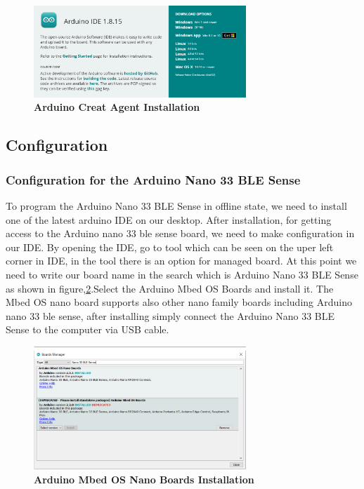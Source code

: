 \begin{figure}[H]\centering
	\includegraphics[width=8cm]{Images/software/ArduinoCreatAgentInstallation}
	\caption{\textbf{Arduino Creat Agent Installation}}
	\label{fig:ArduinoCreatAgentInstallation}		
\end{figure}

\subsection{Configuration}
\subsubsection{Configuration for the Arduino Nano 33 BLE Sense}
To program the Arduino Nano 33 BLE Sense in offline state, we need to install one
of the latest arduino IDE on our desktop. After installation, for getting access to
the Arduino nano 33 ble sense board, we need to make configuration in our IDE. By
opening the IDE, go to tool which can be seen on the uper left corner in IDE, in the
tool there is an option for managed board. At this point we need to write our board
name in the search which is Arduino Nano 33 BLE Sense as shown in figure,\ref{fig:ArduinoMbedOSNanoBoardsInstallation}.Select
the Arduino Mbed OS Boards and install it. The Mbed OS nano board supports also
other nano family boards including Arduino nano 33 ble sense, after installing simply
connect the Arduino Nano 33 BLE Sense to the computer via USB cable.


\begin{figure}[H]\centering
	\includegraphics[width=8cm]{Images/software/ArduinoMbedOSNanoBoardsInstallation}
	\caption{\textbf{Arduino Mbed OS Nano Boards Installation}}
	\label{fig:ArduinoMbedOSNanoBoardsInstallation}		
\end{figure}


